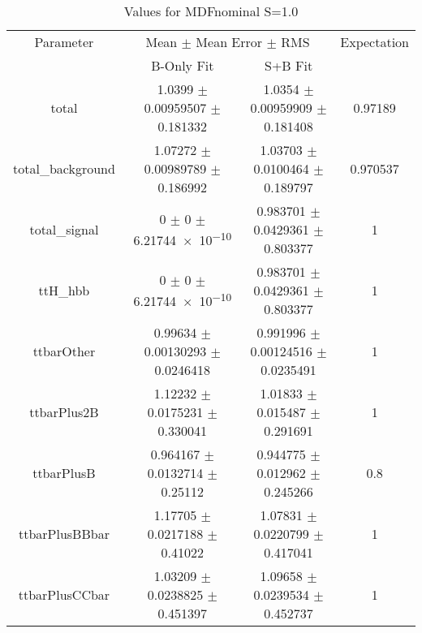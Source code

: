 \begin{table}
\centering
\caption{Values for MDFnominal S=1.0}
\begin{tabular}{cccc}
\toprule
Parameter & \multicolumn{2}{c}{Mean $\pm$ Mean Error $\pm$ RMS} & Expectation\\
 & B-Only Fit & S+B Fit & \\
\midrule
total & \num{1.0399} $\pm$ \num{0.00959507} $\pm$ \num{0.181332} & \num{1.0354} $\pm$ \num{0.00959909} $\pm$ \num{0.181408} & \num{0.97189}\\
total\_background & \num{1.07272} $\pm$ \num{0.00989789} $\pm$ \num{0.186992} & \num{1.03703} $\pm$ \num{0.0100464} $\pm$ \num{0.189797} & \num{0.970537}\\
total\_signal & \num{0} $\pm$ \num{0} $\pm$ \num{6.21744e-10} & \num{0.983701} $\pm$ \num{0.0429361} $\pm$ \num{0.803377} & \num{1}\\
ttH\_hbb & \num{0} $\pm$ \num{0} $\pm$ \num{6.21744e-10} & \num{0.983701} $\pm$ \num{0.0429361} $\pm$ \num{0.803377} & \num{1}\\
ttbarOther & \num{0.99634} $\pm$ \num{0.00130293} $\pm$ \num{0.0246418} & \num{0.991996} $\pm$ \num{0.00124516} $\pm$ \num{0.0235491} & \num{1}\\
ttbarPlus2B & \num{1.12232} $\pm$ \num{0.0175231} $\pm$ \num{0.330041} & \num{1.01833} $\pm$ \num{0.015487} $\pm$ \num{0.291691} & \num{1}\\
ttbarPlusB & \num{0.964167} $\pm$ \num{0.0132714} $\pm$ \num{0.25112} & \num{0.944775} $\pm$ \num{0.012962} $\pm$ \num{0.245266} & \num{0.8}\\
ttbarPlusBBbar & \num{1.17705} $\pm$ \num{0.0217188} $\pm$ \num{0.41022} & \num{1.07831} $\pm$ \num{0.0220799} $\pm$ \num{0.417041} & \num{1}\\
ttbarPlusCCbar & \num{1.03209} $\pm$ \num{0.0238825} $\pm$ \num{0.451397} & \num{1.09658} $\pm$ \num{0.0239534} $\pm$ \num{0.452737} & \num{1}\\
\bottomrule
\end{tabular}
\end{table}